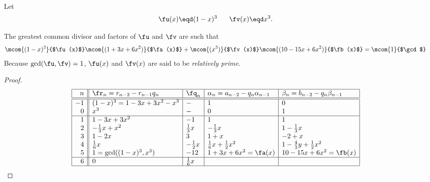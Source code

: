 \begin{example}
\label{ex:eea_n=3}
Let
  \[ \fu(x)\eqd (1-x)^3  \hspace{4ex} \fv(x)\eqd x^3. \]

The greatest common divisor and factors of $\fu$ and $\fv$ are such that
\[
   \mcom{(1-x)^3}{$\fu(x)$} \mcom{(1+3x+6x^2)}{$\fa(x)$}   +
   \mcom{(x^3)  }{$\fv(x)$} \mcom{(10-15x+6x^2)}{$\fb(x)$} =
   \mcom{1}{$\gcd$}
\]
Because $\gcd(\fu,\fv)=1$, $\fu(x)$ and $\fv(x)$ are said to be
{\em relatively prime}.
\end{example}
\begin{proof}
\[\begin{array}{|r||l|l|l|l|}
  \hline
  n  & \fr_n=r_{n-2}-r_{n-1}q_n  & \fq_n   & \alpha_n=a_{n-2}-q_n \alpha_{n-1} & \beta_n=b_{n-2}-q_n \beta_{n-1}  \\
  \hline
  \hline
  -1  & (1-x)^3=1-3x+3x^2-x^3
      & -
      & 1
      & 0
      \\
   0  & x^3
      & -
      & 0
      & 1
      \\
  \hline
   1  & 1-3x+3x^2
      & -1
      &  1
      &  1
      \\
   2  & -\frac{1}{3}x + x^2
      & \frac{1}{3}x
      & -\frac{1}{3}x
      & 1-\frac{1}{3}x
      \\
   3  & 1 -2x
      & 3
      & 1+x
      & -2+x
      \\
   4  & \frac{1}{6}x
      & -\frac{1}{2}x
      & \frac{1}{6}x + \frac{1}{2}x^2
      & 1-\frac{4}{3}y+\frac{1}{2}x^2
      \\
   5  & 1 = \gcd((1-x)^3,x^3)
      & -12
      & 1+3x+6x^2 = \fa(x)
      & 10-15x+6x^2 = \fb(x)
      \\
      \hline
   6  & 0
      & \frac{1}{6}x
      &
      &
      \\
  \hline
\end{array}\]
\end{proof}



